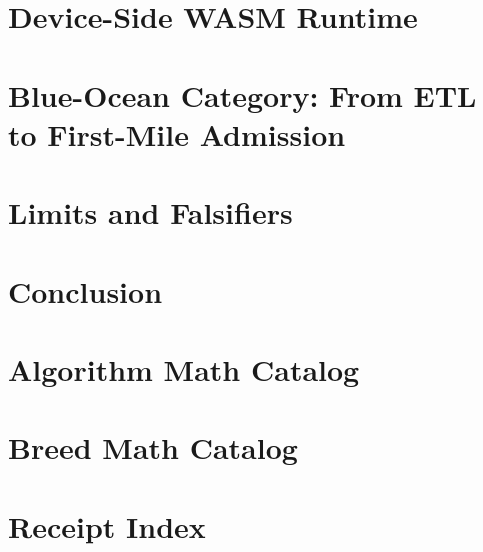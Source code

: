 \section{Device-Side WASM Runtime}
\section{Blue-Ocean Category: From ETL to First-Mile Admission}
\section{Limits and Falsifiers}
\section{Conclusion}
\newpage\appendix
\section{Algorithm Math Catalog}
\section{Breed Math Catalog}
\section{Receipt Index}
